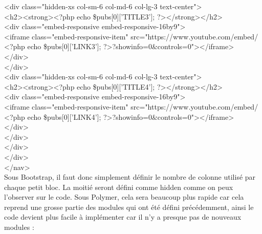 \documentclass{article}
\begin{document}
{{\hspace*{2.4cm}<div class="hidden-xs col-sm-6 col-md-6 col-lg-3 text-center">\\
\hspace*{3.0cm}<h2><strong><?php echo \$pubs[0]['TITLE3']; ?></strong></h2>\\
\hspace*{3.0cm}<div class="embed-responsive embed-responsive-16by9">\\
\hspace*{3.0cm}<iframe class="embed-responsive-item" src="https://www.youtube.com/embed/ <?php echo \$pubs[0]['LINK3']; ?>?showinfo=0\&controls=0"></iframe>\\
\hspace*{3.0cm}</div>\\
\hspace*{2.4cm}</div>\\
\hspace*{2.4cm}<div class="hidden-xs col-sm-6 col-md-6 col-lg-3 text-center">\\
\hspace*{3.0cm}<h2><strong><?php echo \$pubs[0]['TITLE4']; ?></strong></h2>\\
\hspace*{3.0cm}<div class="embed-responsive embed-responsive-16by9">\\
\hspace*{3.0cm}<iframe class="embed-responsive-item" src="https://www.youtube.com/embed/ <?php echo \$pubs[0]['LINK4']; ?>?showinfo=0\&controls=0"></iframe>\\
\hspace*{3.0cm}</div>\\
\hspace*{2.4cm}</div>\\
\hspace*{1.8cm}</div>\\
\hspace*{1.2cm}</div>\\
</nav>
}}
\vspace{0.5cm}\\
Sous Bootstrap, il faut donc simplement d\'efinir le nombre de colonne utilis\'e par chaque petit bloc. La moiti\'e seront d\'efini comme \og hidden \fg{} comme on peux l'observer sur le code. Sous Polymer, cela sera beaucoup plus rapide car cela reprend une grosse partie des modules qui ont \'et\'e d\'efini pr\'ec\'edemment, ainsi le code devient plus facile \`a impl\'ementer car il n'y a presque pas de nouveaux modules :
\vspace{0.5cm}\\
\end{document}
